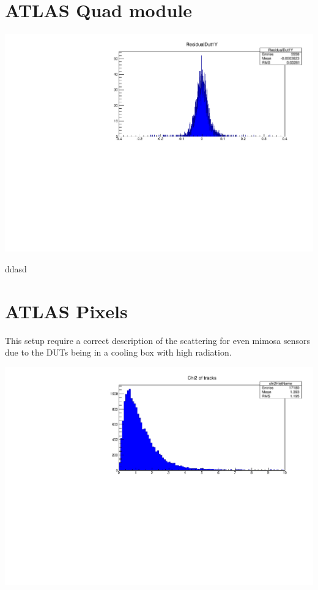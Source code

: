 \documentclass[a0,portrait]{a0poster}
\begin{document}
\begin{multicols}{2}
\section*{ATLAS Quad module}
\begin{center}
\includegraphics[width=0.8\linewidth]{figures/QuadResY.pdf}
\label{trine}
\end{center}
ddasd
\section*{ATLAS Pixels}
This setup require a correct description of the scattering for even mimosa sensors due to the DUTs being in a cooling box with high radiation.


\begin{center}
\includegraphics[width=0.7\linewidth]{figures/chi2-313-Corr.pdf}
\label{trine}
\end{center}


\end{multicols}
\end{document}
